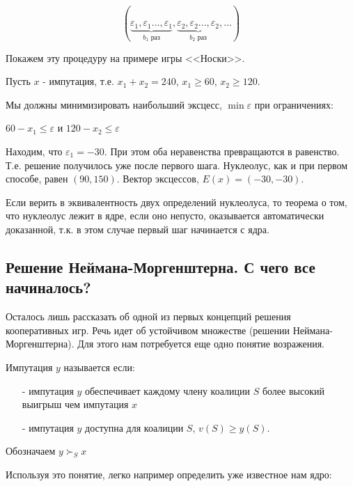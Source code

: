 \begin{equation}
(\underbrace{\varepsilon_{1},\varepsilon_{1} ..., \varepsilon_{1}}_{\mbox{$b_{1}$ раз}}, \underbrace{\varepsilon_{2},\varepsilon_{2} ..., \varepsilon_{2}}_{\mbox{$b_{2}$ раз}}, ...) 
\end{equation}


\begin{myex} Покажем эту процедуру на примере игры <<Носки>>.

Пусть $x$ - импутация, т.е. $x_{1}+x_{2}=240$, $x_{1}\geq 60$, $x_{2}\geq 120$.

Мы должны минимизировать наибольший эксцесс, $\min \varepsilon$ при ограничениях:

$60-x_{1}\leq \varepsilon$ и $120-x_{2}\leq \varepsilon$

Находим, что $\varepsilon_{1}=-30$. При этом оба неравенства превращаются в равенство. Т.е. решение получилось уже после первого шага. Нуклеолус, как и при первом способе, равен $(90,150)$. Вектор эксцессов, $E(x)=(-30,-30)$.
\end{myex}

Если верить в эквивалентность двух определений нуклеолуса, то теорема о том, что нуклеолус лежит в ядре, если оно непусто, оказывается автоматически доказанной, т.к. в этом случае первый шаг начинается с ядра.



\subsection{Решение Неймана-Моргенштерна. С чего все начиналось?}

Осталось лишь рассказать об одной из первых концепций решения кооперативных игр. Речь идет об устойчивом множестве (решении Неймана-Моргенштерна). Для этого нам потребуется еще одно понятие возражения. 

\begin{mydef}
Импутация $y$ называется  если: 
\begin{itemize}
\item[-] импутация $y$ обеспечивает каждому члену коалиции $S$ более высокий выигрыш чем импутация $x$
\item[-] импутация $y$ доступна для коалиции $S$, $v(S)\geq y(S)$.
\end{itemize}
Обозначаем $y\succ_{S} x$
\end{mydef}

Используя это понятие, легко например определить уже известное нам ядро:

